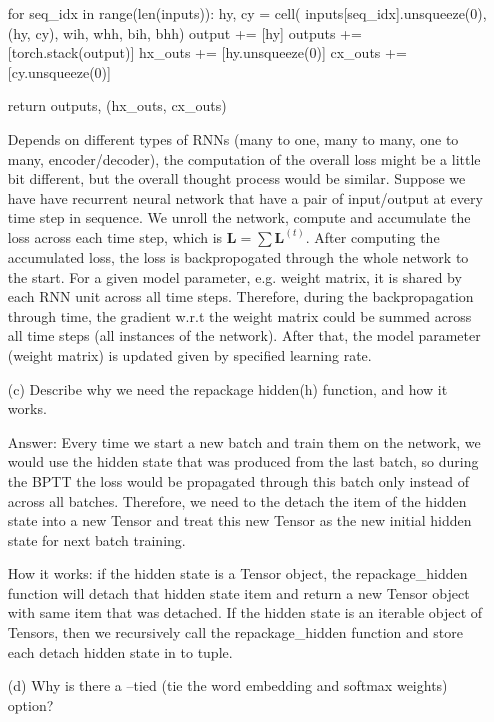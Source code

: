 \documentclass[12pt,letterpaper]{article}
\begin{document}
\begin{itemize}
\begin{python}
            for seq_idx in range(len(inputs)):
                hy, cy = cell(
                    inputs[seq_idx].unsqueeze(0), (hy, cy), wih, whh, bih, bhh)
                output += [hy]
            outputs += [torch.stack(output)]
            hx_outs += [hy.unsqueeze(0)]
            cx_outs += [cy.unsqueeze(0)]

        return outputs, (hx_outs, cx_outs)
    \end{python}
    
    Depends on different types of RNNs (many to one, many to many, one to many, encoder/decoder), the computation of the overall loss might be a little bit different, but the overall thought process would be similar. Suppose we have have recurrent neural network that have a pair of input/output at every time step in sequence. We unroll the network, compute and accumulate the loss across each time step, which is $\textbf{L} = \sum \textbf{L}^{(t)}$. After computing the accumulated loss, the loss is backpropogated through the whole network to the start. For a given model parameter, e.g. weight matrix, it is shared by each RNN unit across all time steps. Therefore, during the backpropagation through time, the gradient w.r.t the weight matrix could be summed across all time steps (all instances of the network). After that, the model parameter (weight matrix) is updated given by specified learning rate.
    
    \item[(c)]Describe why we need the repackage hidden(h) function, and how it works.
    
    Answer: Every time we start a new batch and train them on the network, we would use the hidden state that was produced from the last batch, so during the BPTT the loss would be propagated through this batch only instead of across all batches. Therefore, we need to the detach the item of the hidden state into a new Tensor and treat this new Tensor as the new initial hidden state for next batch training.
    
    How it works: if the hidden state is a Tensor object, the repackage\_hidden function will detach that hidden state item and return a new Tensor object with same item that was detached. If the hidden state is an iterable object of Tensors, then we recursively call the repackage\_hidden function and store each detach hidden state in to tuple.
    
    \item[(d)]Why is there a --tied (tie the word embedding and softmax weights) option?
    

\end{itemize}
\end{document}
